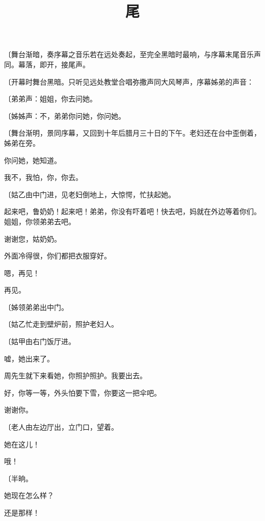 {\fangsong〔舞台渐暗，奏序幕之音乐若在远处奏起，至完全黑暗时最响，与序幕末尾音乐声同。幕落，即开，接尾声。}

\title{尾}

{\fangsong〔开幕时舞台黑暗。只听见远处教堂合唱弥撒声同大风琴声，序幕姊弟的声音：}

{\fangsong〔弟弟声：姐姐，你去问她。}

{\fangsong〔姊姊声：不，弟弟你问她，你问她。}

{\fangsong〔舞台渐明，景同序幕，又回到十年后腊月三十日的下午。老妇还在台中歪倒着，姊弟在旁。}

你问她，她知道。

我不，我怕，你，你去。

{\fangsong〔姑乙由中门进，见老妇倒地上，大惊愕，忙扶起她。}

起来吧，鲁奶奶！起来吧！弟弟，你没有吓着吧！快去吧，妈就在外边等着你们。姐姐，你领弟弟去吧。

谢谢您，姑奶奶。

外面冷得很，你们都把衣服穿好。

嗯，再见！

再见。

{\fangsong〔姊领弟弟出中门。}

{\fangsong〔姑乙忙走到壁炉前，照护老妇人。}

{\fangsong〔姑甲由右门饭厅进。}

嘘，她出来了。

周先生就下来看她，你照护照护。我要出去。

好，你等一等，外头怕要下雪，你要这一把伞吧。

谢谢你。

{\fangsong〔老人由左边厅出，立门口，望着。}

她在这儿！

哦！

{\fangsong〔半晌。}

她现在怎么样？

还是那样！

